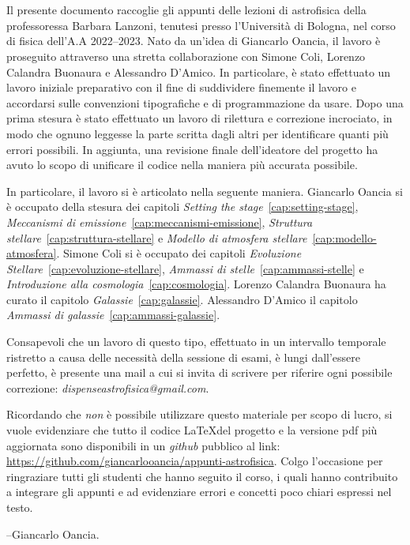 {\noindent \bfseries \Huge \prefacename}
            \thispagestyle{plain}
            \\
            \\
Il presente documento raccoglie gli appunti delle lezioni di astrofisica della professoressa Barbara Lanzoni, tenutesi presso l'Università di Bologna, nel corso di fisica dell'A.A 2022--2023. Nato da un'idea di Giancarlo Oancia, il lavoro è proseguito attraverso una stretta collaborazione con Simone Coli, Lorenzo Calandra Buonaura e Alessandro D'Amico. In particolare, è stato effettuato un lavoro iniziale preparativo con il fine di suddividere finemente il lavoro e accordarsi sulle convenzioni tipografiche e di programmazione da usare. Dopo una prima stesura è stato effettuato un lavoro di rilettura e correzione incrociato, in modo che ognuno leggesse la parte scritta dagli altri per identificare quanti più errori possibili. In aggiunta, una revisione finale dell'ideatore del progetto ha avuto lo scopo di unificare il codice nella maniera più accurata possibile.

In particolare, il lavoro si è articolato nella seguente maniera. Giancarlo Oancia si è occupato della stesura dei capitoli \emph{Setting the stage}~\ref{cap:setting-stage}, \emph{Meccanismi di emissione}~\ref{cap:meccanismi-emissione}, \emph{Struttura stellare}~\ref{cap:struttura-stellare} e \emph{Modello di atmosfera stellare}~\ref{cap:modello-atmosfera}. Simone Coli si è occupato dei capitoli \emph{Evoluzione Stellare}~\ref{cap:evoluzione-stellare}, \emph{Ammassi di stelle}~\ref{cap:ammassi-stelle} e \emph{Introduzione alla cosmologia}~\ref{cap:cosmologia}. Lorenzo Calandra Buonaura ha curato il capitolo \emph{Galassie}~\ref{cap:galassie}. Alessandro D'Amico il capitolo \emph{Ammassi di galassie}~\ref{cap:ammassi-galassie}.

Consapevoli che un lavoro di questo tipo, effettuato in un intervallo temporale ristretto a causa delle necessità della sessione di esami, è lungi dall'essere perfetto, è presente una mail a cui si invita di scrivere per riferire ogni possibile correzione: \emph{dispenseastrofisica@gmail.com}.

Ricordando che \emph{non} è possibile utilizzare questo materiale per scopo di lucro, si vuole evidenziare che tutto il codice \LaTeX del progetto e la versione pdf più aggiornata sono disponibili in un \emph{github} pubblico al link: \url{https://github.com/giancarlooancia/appunti-astrofisica}. Colgo l'occasione per ringraziare tutti gli studenti che hanno seguito il corso, i quali hanno contribuito a integrare gli appunti e ad evidenziare errori e concetti poco chiari espressi nel testo.

\begin{flushright}
    --Giancarlo Oancia.
\end{flushright}



    {}
